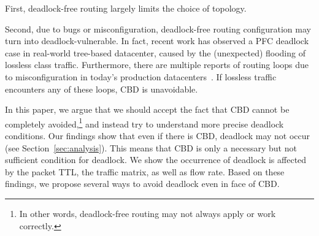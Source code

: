 First, deadlock-free routing largely limits the choice of topology. 

Second, due to bugs or misconfiguration, deadlock-free routing configuration may
turn into deadlock-vulnerable. In fact, recent work has observed a PFC deadlock
case in real-world tree-based datacenter\cite{rdmascale}, caused by the
(unexpected) flooding of lossless class traffic.  Furthermore, there are multiple
reports of routing loops due to misconfiguration in today's production
datacenters~\cite{everflow, libra}. If lossless traffic encounters any of these
loops, CBD is unavoidable.

In this paper, we argue that we should accept the fact that CBD
cannot be completely avoided,\footnote{In other words, deadlock-free
routing may not always apply or work correctly.} and instead try to
understand more precise deadlock conditions.  Our findings show that even if
there is CBD, deadlock may not occur (see
Section~\ref{sec:analysis}).  This means that CBD is only a
necessary but not sufficient condition for deadlock.  We show the occurrence of
deadlock is affected by the packet TTL, the traffic matrix, as well as flow
rate. Based on these findings, we propose several ways to avoid deadlock even in
face of CBD.


